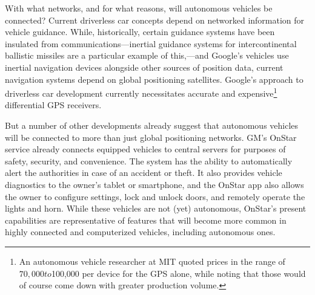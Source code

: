 
With what networks, and for what reasons, will autonomous vehicles be
connected? Current driverless car concepts depend on networked
information for vehicle guidance. While, historically, certain
guidance systems have been insulated from communications---inertial
guidance systems for intercontinental ballistic
missiles are a particular example of this,\cite{mackenzie}---and
Google's vehicles use inertial navigation devices\cite{knightfurther}
alongside other sources of position data, current navigation systems
depend on global positioning satellites. Google's approach to
driverless car development currently necessitates accurate
and expensive\footnote{An autonomous vehicle researcher at MIT
  quoted prices in the range of $70,000 to $100,000 per device for the
GPS alone, while noting that those would of course come down with
greater production volume.} differential GPS receivers.

But a number of other developments already suggest that autonomous
vehicles will be connected to more than just global positioning
networks. GM's OnStar service already connects equipped vehicles to central servers for
purposes of safety, security, and convenience. The system has the
ability to automatically alert the authorities in case of an accident
or theft. It also provides vehicle diagnostics to the owner's tablet
or smartphone, and the OnStar app also allows the owner to configure settings, lock and
unlock doors, and remotely operate the lights and horn.\cite{onstar}
While these vehicles are not (yet) autonomous, OnStar's present
capabilities are representative of features that will become more common in highly
connected and computerized vehicles, including autonomous ones.

